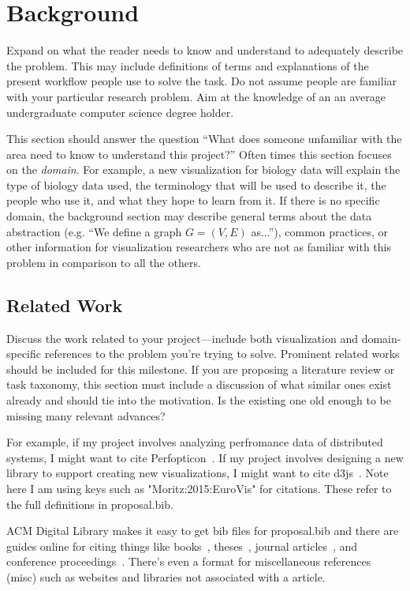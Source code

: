 \section{Background}
\label{sec:background}

Expand on what the reader needs to know and understand to adequately describe
the problem. This may include definitions of terms and explanations of the
present workflow people use to solve the task. Do not assume people are
familiar with your particular research problem. Aim at the knowledge of an
an average undergraduate computer science degree holder.

This section should answer the question ``What does someone unfamiliar with the
area need to know to understand this project?'' Often times this section
focuses on the \textit{domain}. For example, a new visualization for biology
data will explain the type of biology data used, the terminology that will be
used to describe it, the people who use it, and what they hope to learn from
it. If there is no specific domain, the background section may describe
general terms about the data abstraction (e.g. ``We define a graph $G = (V, E)$
as...''), common practices, or other information for visualization researchers
who are not as familiar with this problem in comparison to all the others. 

\subsection{Related Work}
\label{sec:related}

Discuss the work related to your project---include both visualization and
domain-specific references to the problem you're trying to solve. Prominent
related works should be included for this milestone. If you are proposing a
literature review or task taxonomy, this section must include a discussion of
what similar ones exist already and should tie into the motivation. Is the
existing one old enough to be missing many relevant advances?

For example, if my project involves analyzing perfromance data of distributed
systems, I might want to cite Perfopticon~\cite{Moritz:2015:EuroVis}. If my
project involves designing a new library to support creating new
visualizations, I might want to cite d3js~\cite{d3js}. Note here I am using
keys such as "Moritz:2015:EuroVis" for citations. These refer to the full
definitions in proposal.bib.

ACM Digital Library makes it easy to get bib files for proposal.bib and there
are guides online for citing things like books~\cite{ware:2004:IVP},
theses~\cite{levoy:1989:DSV}, journal articles~\cite{Lorensen:1987:MCA}, and
conference proceedings~\cite{Nielson:1991:TAD}. There's even a format for
miscellaneous references (misc) such as websites and libraries not associated
with a article.

